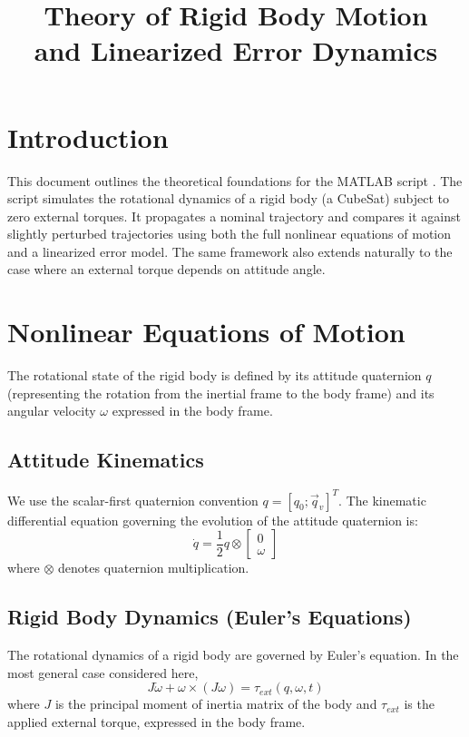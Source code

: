 \documentclass[11pt]{article}
\title{Theory of Rigid Body Motion\\and Linearized Error Dynamics}
\author{}
\date{}
\begin{document}
\maketitle

\section{Introduction}
This document outlines the theoretical foundations for the MATLAB script . The script simulates the rotational dynamics of a rigid body (a CubeSat) subject to zero external torques. It propagates a nominal trajectory and compares it against slightly perturbed trajectories using both the full nonlinear equations of motion and a linearized error model. The same framework also extends naturally to the case where an external torque depends on attitude angle.

\section{Nonlinear Equations of Motion}
The rotational state of the rigid body is defined by its attitude quaternion $q$ (representing the rotation from the inertial frame to the body frame) and its angular velocity $\omega$ expressed in the body frame.

\subsection{Attitude Kinematics}
We use the scalar-first quaternion convention $q = [q_0; \vec{q}_v]^T$. The kinematic differential equation governing the evolution of the attitude quaternion is:
\begin{equation}
    \dot{q} = \frac{1}{2} q \otimes \begin{bmatrix} 0 \\ \omega \end{bmatrix}
\end{equation}
where $\otimes$ denotes quaternion multiplication.

\subsection{Rigid Body Dynamics (Euler's Equations)}
The rotational dynamics of a rigid body are governed by Euler's equation. In the most general case considered here,
\begin{equation}
    J \dot{\omega} + \omega \times (J\omega) = \tau_{ext}(q, \omega, t)
\end{equation}
where $J$ is the principal moment of inertia matrix of the body and $\tau_{ext}$ is the applied external torque, expressed in the body frame.
\end{document}
